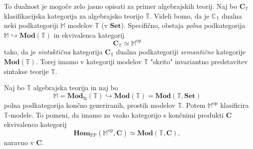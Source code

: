 \documentclass[../kategoricna_logika.tex]{subfiles}
\begin{document}
To dualnost je mogoče zelo jasno opisati za primer algebrajskih
teorij. Naj bo \(\mathbf{C}_{\mathbb{T}}\) klasifikacijska kategorija
za algebrajsko teorijo \(\mathbb{T}\). Videli bomo, da je \(\mathbb{C}_{\mathbb{T}}\)
dualna neki podkategoriji \(\mathbb{M}\) modelov \(\mathbb{T}\) (v \(\mathbf{Set}\)).
Specifično, obstaja \emph{polna} podkategorija 
\(\mathbb{\mathbb{M}} \hookrightarrow \mathbf{Mod}(\mathbb{T})\) in
ekvivalenca kategorij
\[ \mathbf{C}_{\mathbb{T}} \simeq \mathbb{M}^{\mathrm{op}} \]
tako, da je \emph{sintaktična} kategorija \(\mathbf{C}_{\mathbb{T}}\) dualna
podkategoriji \emph{semantične} kategorije \(\mathbf{Mod}(\mathbb{T})\).
Torej imamo v kategoriji modelov \(\mathbb{T}\) "skrito" invariantno
predstavitev sintakse teorije \(\mathbb{T}\).
\begin{izrek}
  Naj bo $\mathbb{T}$ algebrajska teorija in naj bo
  \[ \mathbb{M} = \mathbf{Mod}_{\mathrm{fg}}(\mathbb{T}) \hookrightarrow \mathbf{Mod}(\mathbb{T}) = \mathbf{Mod}(\mathbb{T}, \mathbf{Set}) \]
  polna podkategorija končno generiranih, prostih modelov $\mathbb{T}$.
  Potem $\mathbb{M}^{\mathrm{op}}$ klasificira $\mathbb{T}$-modele.
  To pomeni, da imamo za vsako kategorijo s končnimi produkti $\mathbf{C}$ ekvivalenco kategorij
  \[ \mathbf{Hom}_{\mathrm{FP}}(\mathbb{M}^{\mathrm{op}}, \mathbf{C}) \simeq \mathbf{Mod}(\mathbb{T},\mathbf{C}), \]
  naravno v $\mathbf{C}$.
\end{izrek}
\end{document}
